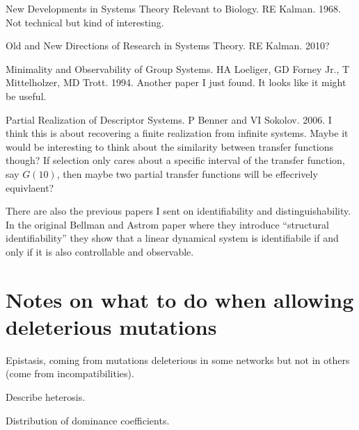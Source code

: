 \documentclass[11 pt]{article}
\begin{document}
New Developments in Systems Theory Relevant to Biology. RE Kalman. 1968.
Not technical but kind of interesting. 

Old and New Directions of Research in Systems Theory. RE Kalman. 2010?

Minimality and Observability of Group Systems. HA Loeliger, GD Forney Jr., T Mittelholzer, MD Trott. 1994. 
Another paper I just found. It looks like it might be useful.

Partial Realization of Descriptor Systems. P Benner and VI Sokolov. 2006. 
I think this is about recovering a finite realization from infinite systems. Maybe it would be interesting to think about the similarity between transfer functions though? If selection only cares about a specific interval of the transfer function, say $G(10)$, then maybe two partial transfer functions will be effecrively equivlaent? 

There are also the previous papers I sent on identifiability and distinguishability. In the original Bellman and Astrom paper where they introduce ``structural identifiability'' they show that a linear dynamical system is identifiabile if and only if it is also controllable and observable. 


\section{Notes on what to do when allowing deleterious mutations}

Epistasis, coming from mutations deleterious in some networks but not in others
(come from incompatibilities).

Describe heterosis.

Distribution of dominance coefficients.



\end{document}
